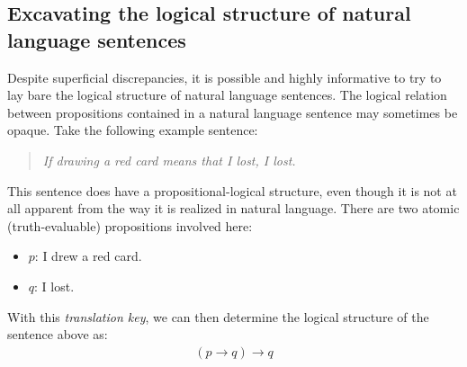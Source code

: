 \documentclass[nobib,nofonts]{tufte-handout}
\begin{document}
\subsection{Excavating the logical structure of natural language sentences}

Despite superficial discrepancies, it is possible and highly informative to try to lay bare the logical structure of natural language sentences.
The logical relation between propositions contained in a natural language sentence may sometimes be opaque.
Take the following example sentence:
\begin{quote}
  \emph{If drawing a red card means that I lost, I lost.}
\end{quote}
This sentence does have a propositional-logical structure, even though it is not at all apparent from the way it is realized in natural language.
There are two atomic (truth-evaluable) propositions involved here:
\begin{multicols}{2}
  \begin{itemize}[]
    \item $p$: I drew a red card.
    \item $q$: I lost.
  \end{itemize}
\end{multicols}
\noindent With this \emph{translation key}, we can then determine the logical structure of the sentence above as:
\begin{align*}
  (p \rightarrow q) \rightarrow q
\end{align*}
\end{document}
